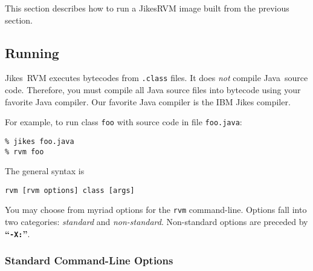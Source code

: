 This section describes how to run a Jikes\trademark RVM  image built
from the previous section. 

\subsection{Running \jrvm}

Jikes\trademark\ RVM executes bytecodes from {\tt .class} files. It does {\em
not} compile 
Java\trademark\ source code. Therefore, you must compile all Java source
files into bytecode using your favorite Java compiler.
Our favorite Java compiler is the IBM Jikes compiler. 

For example, to run class {\tt foo} with source code in file {\tt foo.java}:
\begin{verbatim}
% jikes foo.java
% rvm foo 
\end{verbatim}

The general syntax is
\begin{verbatim}
rvm [rvm options] class [args]
\end{verbatim}

You may choose from myriad options for the {\tt rvm} command-line.  
Options fall into two categories: {\em standard} and {\em
non-standard}.  Non-standard options are preceded by {\bf ``{\tt -X:}''}.

\subsubsection{Standard Command-Line Options}

